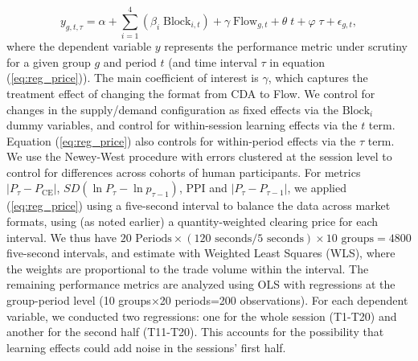 \documentclass[12pt]{article}
\begin{document}
\begin{equation} \label{eq:reg_price}
    y_{g,t,\tau} = \alpha + \sum^{4}_{i = 1} \left(\beta_i \; \text{Block}_{i,t}\right) + \gamma \; \text{Flow}_{g,t} + \theta \; t + \varphi \; \tau + \epsilon_{g,t}, 
\end{equation}
where the dependent variable $y$ represents the performance metric under scrutiny for a given group $g$ and period $t$ (and time interval $\tau$ in equation (\ref{eq:reg_price})). 
The main coefficient of interest is $\gamma$, which captures the treatment effect of changing the format from CDA to Flow.
We control for changes in the supply/demand configuration as fixed effects via the $\text{Block}_i$ dummy variables,
and control for within-session learning effects via the $t$ term.
Equation (\ref{eq:reg_price}) also controls for within-period effects via the $\tau$ term. 
We use the Newey-West procedure with errors clustered at the session level to control for differences across cohorts of human participants.
For metrics $\lvert P_{\tau} - P_{\text{CE}}\rvert$, $SD\left(\ln P_{\tau} - \ln p_{{\tau} - 1}\right)$, PPI and $\lvert P_{{\tau}} - P_{{\tau} - 1}\rvert$, we applied (\ref{eq:reg_price}) using a five-second interval to balance the data across market formats, using (as noted earlier) a quantity-weighted clearing price for each interval. %
We thus have $20 \text{ Periods} \times (120 \text{ seconds} / 5 \text{ seconds}) \times 10 \text{ groups}= 4800$ five-second intervals, and 
estimate with Weighted Least Squares (WLS), where the weights are proportional to the trade volume within the interval. 
The remaining performance metrics are analyzed using OLS with regressions at the group-period level (10 groups×20 periods=200 observations). 
For each dependent variable, we conducted two regressions: one for the whole session (T1-T20) and another for the second half (T11-T20). This accounts for the possibility that learning effects could add noise in the sessions' first half. 

\end{document}
